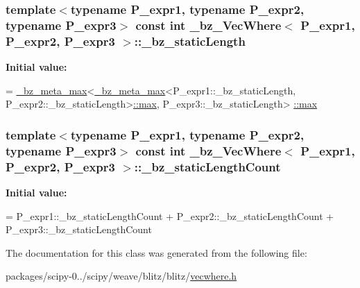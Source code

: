 \subsubsection[{\+\_\+bz\+\_\+static\+Length}]{\setlength{\rightskip}{0pt plus 5cm}template$<$typename P\+\_\+expr1, typename P\+\_\+expr2, typename P\+\_\+expr3$>$ const int {\bf \+\_\+bz\+\_\+\+Vec\+Where}$<$ P\+\_\+expr1, P\+\_\+expr2, P\+\_\+expr3 $>$\+::\+\_\+bz\+\_\+static\+Length\hspace{0.3cm}{\ttfamily [static]}}\label{class__bz__VecWhere_a0518cd41c6d8268d0d7713cac78f6e6f}
{\bfseries Initial value\+:}
\begin{DoxyCode}
=
            \hyperlink{class__bz__meta__max}{\_bz\_meta\_max}<\hyperlink{class__bz__meta__max}{\_bz\_meta\_max}<P\_expr1::\_bz\_staticLength, 
            P\_expr2::\_bz\_staticLength>\hyperlink{dlamch_8c_affe776513b24d84b39af8ab0930fef7f}{::max}, P\_expr3::\_bz\_staticLength>
      \hyperlink{dlamch_8c_affe776513b24d84b39af8ab0930fef7f}{::max}
\end{DoxyCode}
\hypertarget{class__bz__VecWhere_a9b8b6bd4c034bd899ad8370387af5306}{}
\subsubsection[{\+\_\+bz\+\_\+static\+Length\+Count}]{\setlength{\rightskip}{0pt plus 5cm}template$<$typename P\+\_\+expr1, typename P\+\_\+expr2, typename P\+\_\+expr3$>$ const int {\bf \+\_\+bz\+\_\+\+Vec\+Where}$<$ P\+\_\+expr1, P\+\_\+expr2, P\+\_\+expr3 $>$\+::\+\_\+bz\+\_\+static\+Length\+Count\hspace{0.3cm}{\ttfamily [static]}}\label{class__bz__VecWhere_a9b8b6bd4c034bd899ad8370387af5306}
{\bfseries Initial value\+:}
\begin{DoxyCode}
= P\_expr1::\_bz\_staticLengthCount
                              + P\_expr2::\_bz\_staticLengthCount
                              + P\_expr3::\_bz\_staticLengthCount
\end{DoxyCode}


The documentation for this class was generated from the following file\+:\begin{DoxyCompactItemize}
\item 
packages/scipy-\/0../scipy/weave/blitz/blitz/\hyperlink{vecwhere_8h}{vecwhere.\+h}\end{DoxyCompactItemize}
